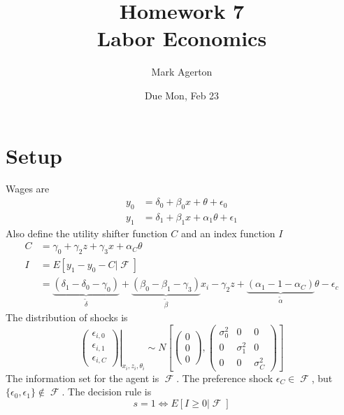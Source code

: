 \documentclass[11pt,letterpaper]{article}
\title{\textbf{Homework 7} \\ Labor Economics}
\author{Mark Agerton}
\date{Due Mon, Feb 23}
\DeclareMathOperator\F{\mathcal{F}}
\begin{document}
\maketitle

\section{Setup}
Wages are
\begin{align*}
y_0 &= \delta_0 + \beta_0 x + \theta + \epsilon_0 \\
y_1 &= \delta_1 + \beta_1 x + \alpha_1\theta + \epsilon_1
\end{align*}
Also define the utility shifter function $C$ and an index function $I$
\begin{align*}
C &= \gamma_0 + \gamma_2 z + \gamma_3 x + \alpha_C \theta  \\
I &= E[y_1 - y_0 - C|\F]  \\
  &= \underbrace{(\delta_1 - \delta_0 - \gamma_0)}_{\widetilde \delta} + \underbrace{(\beta_0 - \beta_1 - \gamma_3)}_{\widetilde \beta} x_i - \gamma_2 z + \underbrace{(\alpha_1 - 1- \alpha_C)}_{\widetilde \alpha} \theta - \epsilon_{c}
\end{align*}
The distribution of shocks is
\[
\left. \begin{pmatrix} \epsilon_{i,0} \\ \epsilon_{i,1} \\ \epsilon_{i,C} \end{pmatrix} \right|_{x_i,z_i,\theta_i}
\sim N
\left[ \begin{pmatrix} 0 \\ 0 \\ 0 \end{pmatrix}, \begin{pmatrix} \sigma_0^2& 0 & 0\\0& \sigma_1^2& 0 \\0 & 0& \sigma_C^2\end{pmatrix}	\right] 
\]
The information set for the agent is $\F$. The preference shock $\epsilon_C \in \F$, but $\{\epsilon_0,\epsilon_1\} \notin \F$. The decision rule is
\[
s = 1 \Longleftrightarrow E[I \geq 0 | \F]
\]
\end{document}
